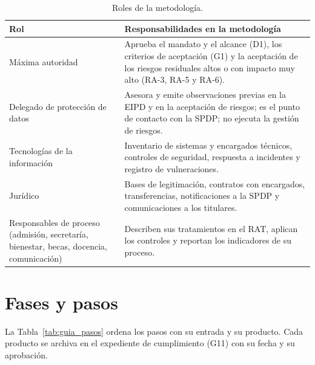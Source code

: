\begin{table}[htbp]
\centering
\caption{Roles de la metodología.}
\label{tab:guia_roles}
\scriptsize
\renewcommand{\arraystretch}{1.2}
\begin{tabularx}{\textwidth}{|>{\raggedright\arraybackslash}p{3.2cm}|L|}
  \hline
  \textbf{Rol} & \textbf{Responsabilidades en la metodología} \\
  \hline
  Máxima autoridad & Aprueba el mandato y el alcance (D1), los criterios de aceptación (G1) y la aceptación de los riesgos residuales altos o con impacto muy alto (RA-3, RA-5 y RA-6). \\ \hline
  Delegado de protección de datos & Asesora y emite observaciones previas en la EIPD y en la aceptación de riesgos; es el punto de contacto con la SPDP; no ejecuta la gestión de riesgos. \\ \hline
  Tecnologías de la información & Inventario de sistemas y encargados técnicos, controles de seguridad, respuesta a incidentes y registro de vulneraciones. \\ \hline
  Jurídico & Bases de legitimación, contratos con encargados, transferencias, notificaciones a la SPDP y comunicaciones a los titulares. \\ \hline
  Responsables de proceso (admisión, secretaría, bienestar, becas, docencia, comunicación) & Describen sus tratamientos en el RAT, aplican los controles y reportan los indicadores de su proceso. \\ \hline
\end{tabularx}
\raggedright
{}
\end{table}

\section{Fases y pasos}

La Tabla~\ref{tab:guia_pasos} ordena los pasos con su entrada y su producto. Cada producto se archiva en el expediente de cumplimiento (G11) con su fecha y su aprobación.

